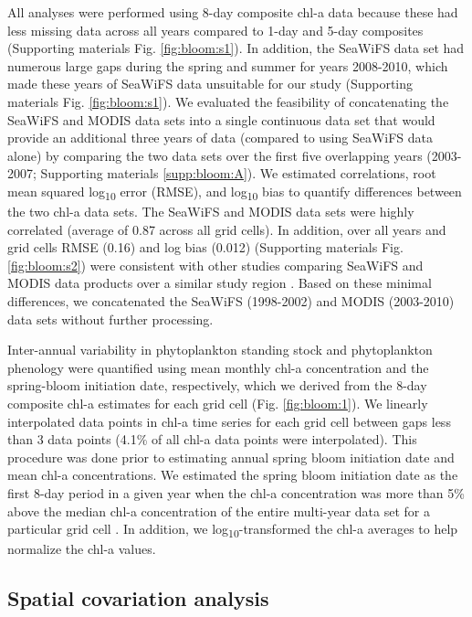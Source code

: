 All analyses were performed using 8-day composite chl-a data because these had
less missing data across all years compared to 1-day and 5-day composites
(Supporting materials Fig. \ref{fig:bloom:s1}). In addition, the SeaWiFS data
set had numerous large gaps during the spring and summer for years 2008-2010,
which made these years of SeaWiFS data unsuitable for our study (Supporting
materials Fig. \ref{fig:bloom:s1}). We evaluated the feasibility of
concatenating the SeaWiFS and MODIS data sets into a single continuous data set
that would provide an additional three years of data (compared to using SeaWiFS
data alone) by comparing the two data sets over the first five overlapping years
(2003-2007; Supporting materials \ref{supp:bloom:A}). We estimated correlations,
root mean squared log\textsubscript{10} error (RMSE), and log\textsubscript{10}
bias to quantify differences between the two chl-a data sets. The SeaWiFS and
MODIS data sets were highly correlated (average of 0.87 across all grid cells).
In addition, over all years and grid cells RMSE (0.16) and log bias (0.012)
(Supporting materials Fig. \ref{fig:bloom:s2}) were consistent with other
studies comparing SeaWiFS and MODIS data products over a similar study region
\citep{Waite2013}. Based on these minimal differences, we concatenated the
SeaWiFS (1998-2002) and MODIS (2003-2010) data sets without further processing.

Inter-annual variability in phytoplankton standing stock and phytoplankton
phenology were quantified using mean monthly chl-a concentration and the
spring-bloom initiation date, respectively, which we derived from the 8-day
composite chl-a estimates for each grid cell (Fig. \ref{fig:bloom:1}). We
linearly interpolated data points in chl-a time series for each grid cell
between gaps less than 3 data points (4.1\% of all chl-a data points were
interpolated). This procedure was done prior to estimating annual spring bloom
initiation date and mean chl-a concentrations. We estimated the spring bloom
initiation date as the first 8-day period in a given year when the chl-a
concentration was more than 5\% above the median chl-a concentration of the
entire multi-year data set for a particular grid cell \citep{Siegel2002a,
Henson2007a}. In addition, we log\textsubscript{10}-transformed the chl-a
averages to help normalize the chl-a values.


\subsection{Spatial covariation analysis}

